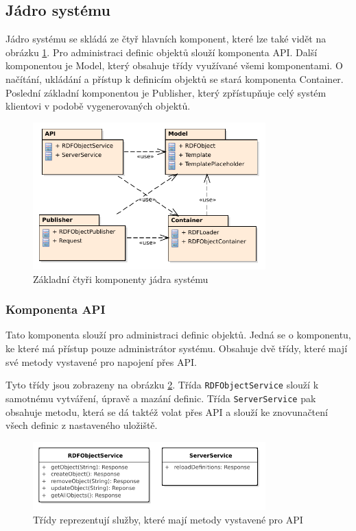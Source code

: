 \documentclass[thesis=B,czech]{FITthesis}[2012/06/26]
\begin{document}
  \subsection{Jádro systému}  
  Jádro systému se skládá ze čtyř hlavních komponent, které lze také vidět na obrázku \ref{packages_core}. Pro administraci definic objektů slouží komponenta API. Další komponentou je Model, který obsahuje
  třídy využívané všemi komponentami. O načítání, ukládání a přístup k definicím objektů se stará komponenta Container.
  Poslední základní komponentou je Publisher, který zpřístupňuje celý systém klientovi v podobě vygenerovaných objektů.
  
  
  \begin{figure}\centering
 	\includegraphics[width=0.8\textwidth]{Components.pdf}
 	\caption[Model komponent]{Základní čtyři komponenty jádra systému}\label{packages_core}
 \end{figure}
  
  \subsubsection{Komponenta API}\label{component_api}
    Tato komponenta slouží pro administraci definic objektů. Jedná se o komponentu, ke které má přístup pouze administrátor systému. Obsahuje dvě třídy, které
    mají své metody vystavené pro napojení přes API.
    
    Tyto třídy jsou zobrazeny na obrázku \ref{api_class}. Třída  \texttt{RDFObjectService} slouží k samotnému vytváření, úpravě a mazání definic.  
    Třída \texttt{ServerService} pak obsahuje
    metodu, která se dá taktéž volat přes API a slouží ke znovunačtení všech definic z nastaveného uložiště.
    \begin{figure}\centering
 	\includegraphics[width=0.8\textwidth]{API.pdf}
 	\caption[Model tříd API]{Třídy reprezentují služby, které mají metody vystavené pro API}\label{api_class}
    \end{figure}
    
\end{document}

